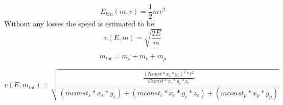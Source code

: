 \documentclass[../MainPaper.tex]{subfiles}
\begin{document}
\begin{equation}
	E_{kin}(m, v) = \frac{1}{2} m v^2
\end{equation}
\noindent Without any losses the speed is estimated to be:
\begin{equation}
	v(E, m) = \sqrt{\frac{2E}{m}}
\end{equation}

\begin{equation}
	m_{tot} = m_s + m_c + m_p
\end{equation}

\begin{equation}
	v(E, m_{tot}) = \sqrt{\frac{\frac{(Iconst * x_s * y_s)^2 * t^2}{Cconst * x_c * y_c * z_c}}{(mconst_s * x_s * y_s) + (mconst_c * x_c * y_c * z_c) + (mconst_p * x_p * y_p)}}
\end{equation}
\end{document}
